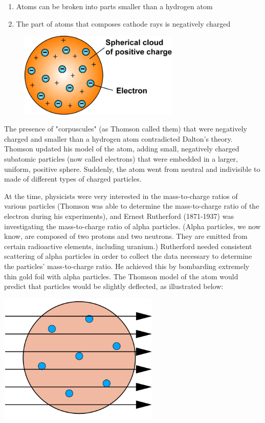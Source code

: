 \begin{enumerate}
\item Atoms can be broken into parts smaller than a hydrogen atom
\item The part of atoms that composes cathode rays is negatively charged
\end{enumerate}

\begin{figure}
\noindent\includegraphics[width=3in]{thomson_model.png}
\end{figure}

The presence of "corpuscules" (as Thomson called them) that were negatively
charged and smaller than a hydrogen atom contradicted Dalton's theory. Thomson
updated his model of the atom, adding small, negatively charged subatomic
particles (now called electrons) that were embedded in a larger, uniform, positive
sphere. Suddenly, the atom went from neutral and indivisible to made of different
types of charged particles.

At the time, physicists were very interested in the mass-to-charge ratios of
various particles (Thomson was able to determine the mass-to-charge ratio of the
electron during his experiments), and Ernest Rutherford (1871-1937) was
investigating the mass-to-charge ratio of alpha particles. (Alpha particles, we
now know, are composed of two protons and two neutrons. They are emitted from
certain radioactive elements, including uranium.) Rutherford needed consistent
scattering of alpha particles in order to collect the data necessary to determine
the particles' mass-to-charge ratio. He achieved this by bombarding extremely
thin gold foil with alpha particles. The Thomson model of the atom would predict
that particles would be slightly deflected, as illustrated below:

\begin{center}
\includegraphics[width=3in]{thomson_gold.png}
\end{center}

